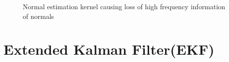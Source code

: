 \documentclass[]{article}
\begin{document}
{\begin{figure}[tbp]
	\centering     %
	\;

	\caption{Normal estimation kernel causing loss of high frequency information of normals}
	\label{fig:spurious_plane_normals}
\end{figure}




\clearpage %
\section{Extended Kalman Filter\ac{(EKF)}} %
\label{sec:ekf}

}
\end{document}
